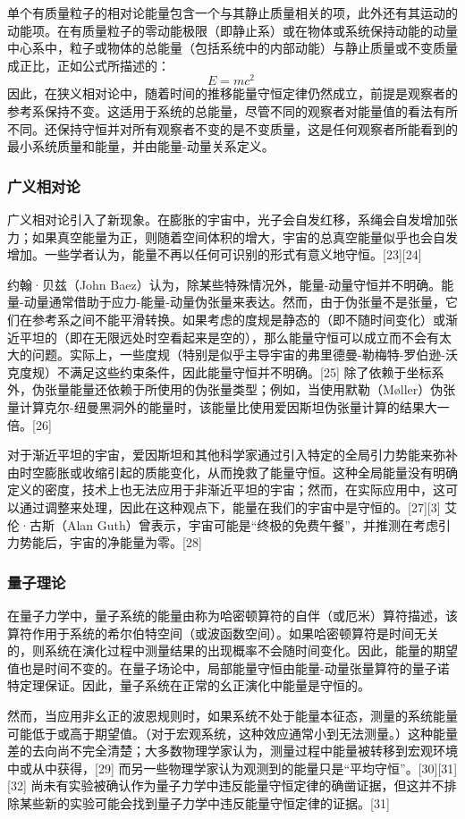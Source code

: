 单个有质量粒子的相对论能量包含一个与其静止质量相关的项，此外还有其运动的动能项。在有质量粒子的零动能极限（即静止系）或在物体或系统保持动能的动量中心系中，粒子或物体的总能量（包括系统中的内部动能）与静止质量或不变质量成正比，正如公式所描述的：
\[
E = mc^{2}~
\]
因此，在狭义相对论中，随着时间的推移能量守恒定律仍然成立，前提是观察者的参考系保持不变。这适用于系统的总能量，尽管不同的观察者对能量值的看法有所不同。还保持守恒并对所有观察者不变的是不变质量，这是任何观察者所能看到的最小系统质量和能量，并由能量-动量关系定义。
\subsubsection{广义相对论}
广义相对论引入了新现象。在膨胀的宇宙中，光子会自发红移，系绳会自发增加张力；如果真空能量为正，则随着空间体积的增大，宇宙的总真空能量似乎也会自发增加。一些学者认为，能量不再以任何可识别的形式有意义地守恒。[23][24]

约翰·贝兹（John Baez）认为，除某些特殊情况外，能量-动量守恒并不明确。能量-动量通常借助于应力-能量-动量伪张量来表达。然而，由于伪张量不是张量，它们在参考系之间不能平滑转换。如果考虑的度规是静态的（即不随时间变化）或渐近平坦的（即在无限远处时空看起来是空的），那么能量守恒可以成立而不会有太大的问题。实际上，一些度规（特别是似乎主导宇宙的弗里德曼-勒梅特-罗伯逊-沃克度规）不满足这些约束条件，因此能量守恒并不明确。[25] 除了依赖于坐标系外，伪张量能量还依赖于所使用的伪张量类型；例如，当使用默勒（Møller）伪张量计算克尔-纽曼黑洞外的能量时，该能量比使用爱因斯坦伪张量计算的结果大一倍。[26]

对于渐近平坦的宇宙，爱因斯坦和其他科学家通过引入特定的全局引力势能来弥补由时空膨胀或收缩引起的质能变化，从而挽救了能量守恒。这种全局能量没有明确定义的密度，技术上也无法应用于非渐近平坦的宇宙；然而，在实际应用中，这可以通过调整来处理，因此在这种观点下，能量在我们的宇宙中是守恒的。[27][3] 艾伦·古斯（Alan Guth）曾表示，宇宙可能是“终极的免费午餐”，并推测在考虑引力势能后，宇宙的净能量为零。[28]
\subsubsection{量子理论}
在量子力学中，量子系统的能量由称为哈密顿算符的自伴（或厄米）算符描述，该算符作用于系统的希尔伯特空间（或波函数空间）。如果哈密顿算符是时间无关的，则系统在演化过程中测量结果的出现概率不会随时间变化。因此，能量的期望值也是时间不变的。在量子场论中，局部能量守恒由能量-动量张量算符的量子诺特定理保证。因此，量子系统在正常的幺正演化中能量是守恒的。

然而，当应用非幺正的波恩规则时，如果系统不处于能量本征态，测量的系统能量可能低于或高于期望值。（对于宏观系统，这种效应通常小到无法测量。）这种能量差的去向尚不完全清楚；大多数物理学家认为，测量过程中能量被转移到宏观环境中或从中获得，[29] 而另一些物理学家认为观测到的能量只是“平均守恒”。[30][31][32] 尚未有实验被确认作为量子力学中违反能量守恒定律的确凿证据，但这并不排除某些新的实验可能会找到量子力学中违反能量守恒定律的证据。[31]
